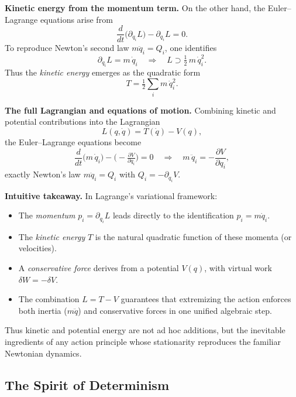 \medskip

\noindent\textbf{Kinetic energy from the momentum term.}  On the other hand, the Euler–Lagrange equations arise from
\[
\frac{d}{dt}\!\bigl(\partial_{\dot q_{i}}L\bigr) - \partial_{q_{i}}L = 0.
\]
To reproduce Newton’s second law \(m\ddot q_{i} = Q_{i}\), one identifies
\[
\partial_{\dot q_{i}}L = m\,\dot q_{i}
\quad\Longrightarrow\quad
L \supset \tfrac12\,m\,\dot q_{i}^{2}.
\]
Thus the \emph{kinetic energy} emerges as the quadratic form
\[
T = \tfrac12 \sum_{i} m\,\dot q_{i}^{2}.
\]

\medskip

\noindent\textbf{The full Lagrangian and equations of motion.}  Combining kinetic and potential contributions into the Lagrangian
\[
L(q,\dot q) = T(\dot q) - V(q),
\]
the Euler–Lagrange equations become
\[
\frac{d}{dt}\!\bigl(m\,\dot q_{i}\bigr)
- \bigl(-\tfrac{\partial V}{\partial q_{i}}\bigr)
= 0
\quad\Longrightarrow\quad
m\,\ddot q_{i} = -\frac{\partial V}{\partial q_{i}},
\]
exactly Newton’s law \(m\ddot q_{i}=Q_{i}\) with \(Q_{i}=-\partial_{q_{i}}V\).

\medskip

\noindent\textbf{Intuitive takeaway.}  In Lagrange’s variational framework:

\begin{itemize}
  \item The \emph{momentum} \(p_{i} = \partial_{\dot q_{i}}L\) leads directly to the identification \(p_{i}=m\dot q_{i}\).  
  \item The \emph{kinetic energy} \(T\) is the natural quadratic function of these momenta (or velocities).  
  \item A \emph{conservative force} derives from a potential \(V(q)\), with virtual work \(\delta W=-\delta V\).  
  \item The combination \(L = T - V\) guarantees that extremizing the action enforces both inertia (\(m\ddot q\)) and conservative forces in one unified algebraic step.
\end{itemize}

Thus kinetic and potential energy are not ad hoc additions, but the inevitable ingredients of any action principle whose stationarity reproduces the familiar Newtonian dynamics.  



\subsection{The Spirit of Determinism}

